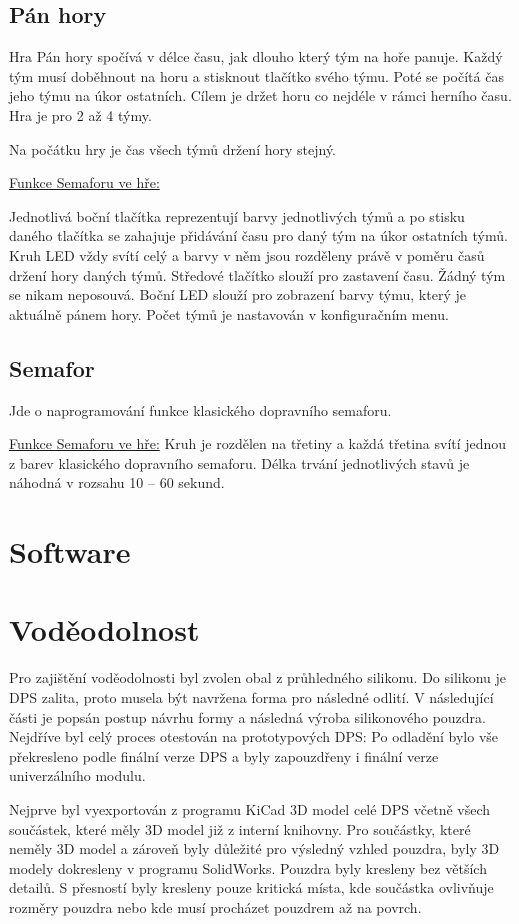 \section{Pán hory}
Hra Pán hory spočívá v délce času, jak dlouho který tým na hoře panuje. Každý tým musí doběhnout na horu a stisknout tlačítko svého týmu. Poté se počítá čas jeho týmu na úkor 
ostatních. Cílem je držet horu co nejdéle v rámci herního času. Hra je pro 2 až 4 týmy. 

Na počátku hry je čas všech týmů držení hory stejný. 

\underline{Funkce Semaforu ve hře:}

Jednotlivá boční tlačítka reprezentují barvy jednotlivých týmů a po stisku daného tlačítka se zahajuje přidávání času pro daný tým na úkor ostatních týmů. Kruh LED vždy svítí celý 
a barvy v něm jsou rozděleny právě v poměru časů držení hory daných týmů. Středové tlačítko slouží pro zastavení času. Žádný tým se nikam neposouvá. Boční LED slouží pro zobrazení 
barvy týmu, který je aktuálně pánem hory. Počet týmů je nastavován v konfiguračním menu. 

\section{Semafor}
Jde o naprogramování funkce klasického dopravního semaforu. 

\underline{Funkce Semaforu ve hře:}
Kruh je rozdělen na třetiny a každá třetina svítí jednou z barev klasického dopravního semaforu. Délka trvání jednotlivých stavů je náhodná v rozsahu 10 – 60 sekund. 


\chapter{Software}



\chapter{Voděodolnost}
Pro zajištění voděodolnosti byl zvolen obal z průhledného silikonu. Do silikonu je DPS zalita, proto musela být navržena forma pro následné odlití. V následující části je popsán postup 
návrhu formy a následná výroba silikonového pouzdra. Nejdříve byl celý proces otestován na prototypových DPS: Po odladění bylo vše překresleno podle finální verze DPS a byly zapouzdřeny
i finální verze univerzálního modulu.  

Nejprve byl vyexportován z programu KiCad 3D model celé DPS včetně všech součástek, které měly 3D model již z interní knihovny. Pro součástky, které neměly 3D model a zároveň byly důležité 
pro výsledný vzhled pouzdra, byly 3D modely dokresleny v programu SolidWorks. Pouzdra byly kresleny bez větších detailů. S přesností byly kresleny pouze kritická místa, kde součástka ovlivňuje 
rozměry pouzdra nebo kde musí procházet pouzdrem až na povrch.

